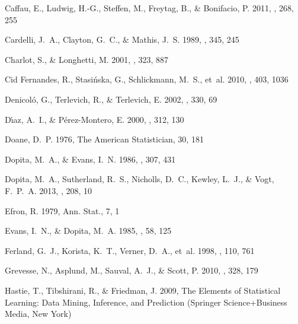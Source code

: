 \documentclass{emulateapj} \usepackage{amsmath} \usepackage{float}
\begin{document}
\begin{thebibliography}{}
{Caffau}, E., {Ludwig}, H.-G., {Steffen}, M., {Freytag}, B., \& {Bonifacio}, P.
  2011, \solphys, 268, 255

{Cardelli}, J.~A., {Clayton}, G.~C., \& {Mathis}, J.~S. 1989, \apj, 345, 245

{Charlot}, S., \& {Longhetti}, M. 2001, \mnras, 323, 887

{Cid Fernandes}, R., {Stasi{\'n}ska}, G., {Schlickmann}, M.~S., {et~al.} 2010,
  \mnras, 403, 1036

{Denicol{\'o}}, G., {Terlevich}, R., \& {Terlevich}, E. 2002, \mnras, 330, 69

{D{\'{\i}}az}, A.~I., \& {P{\'e}rez-Montero}, E. 2000, \mnras, 312, 130

Doane, D.~P. 1976, The American Statistician, 30, 181

{Dopita}, M.~A., \& {Evans}, I.~N. 1986, \apj, 307, 431

{Dopita}, M.~A., {Sutherland}, R.~S., {Nicholls}, D.~C., {Kewley}, L.~J., \&
  {Vogt}, F.~P.~A. 2013, \apjs, 208, 10

{Efron}, R. 1979, Ann. Stat., 7, 1

{Evans}, I.~N., \& {Dopita}, M.~A. 1985, \apjs, 58, 125

{Ferland}, G.~J., {Korista}, K.~T., {Verner}, D.~A., {et~al.} 1998, \pasp, 110,
  761

{Grevesse}, N., {Asplund}, M., {Sauval}, A.~J., \& {Scott}, P. 2010, \apss,
  328, 179

{Hastie}, T., {Tibshirani}, R., \& {Friedman}, J. 2009, {The Elements of
  Statistical Learning: Data Mining, Inference, and Prediction} (Springer
  Science+Business Media, New York)


\end{thebibliography}
\end{document}
